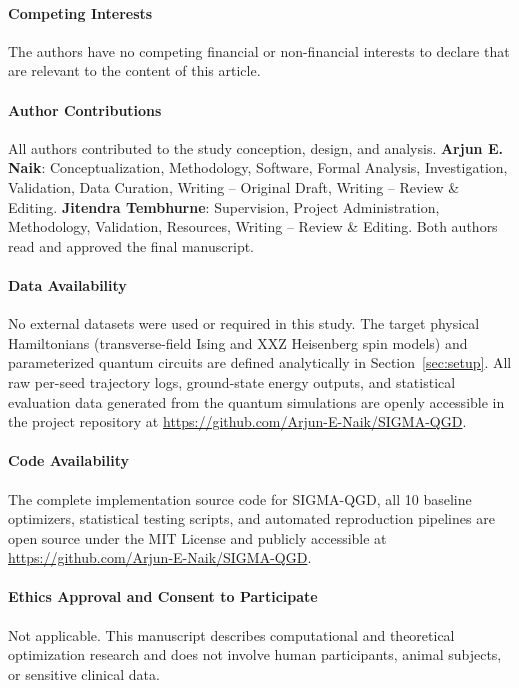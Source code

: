 \documentclass[11pt,a4paper]{article}
\begin{document}
\paragraph{Competing Interests}
The authors have no competing financial or non-financial interests to declare that are relevant to the content of this article.

\paragraph{Author Contributions}
All authors contributed to the study conception, design, and analysis.
\textbf{Arjun E. Naik}: Conceptualization, Methodology, Software, Formal Analysis, Investigation, Validation, Data Curation, Writing -- Original Draft, Writing -- Review \& Editing.
\textbf{Jitendra Tembhurne}: Supervision, Project Administration, Methodology, Validation, Resources, Writing -- Review \& Editing.
Both authors read and approved the final manuscript.

\paragraph{Data Availability}
No external datasets were used or required in this study. The target physical Hamiltonians (transverse-field Ising and XXZ Heisenberg spin models) and parameterized quantum circuits are defined analytically in Section~\ref{sec:setup}. All raw per-seed trajectory logs, ground-state energy outputs, and statistical evaluation data generated from the quantum simulations are openly accessible in the project repository at \url{https://github.com/Arjun-E-Naik/SIGMA-QGD}.

\paragraph{Code Availability}
The complete implementation source code for SIGMA-QGD, all 10 baseline optimizers, statistical testing scripts, and automated reproduction pipelines are open source under the MIT License and publicly accessible at \url{https://github.com/Arjun-E-Naik/SIGMA-QGD}.

\paragraph{Ethics Approval and Consent to Participate}
Not applicable. This manuscript describes computational and theoretical optimization research and does not involve human participants, animal subjects, or sensitive clinical data.
\end{document}
